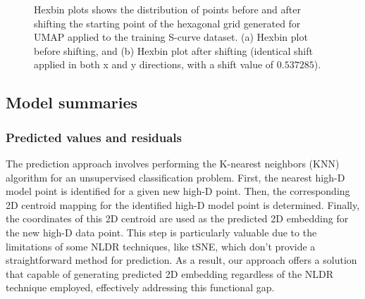 \documentclass[
  12pt]{article}
\begin{document}
\begin{figure}[H]


\caption{\label{fig-scurveshifthexgrids}Hexbin plots shows the
distribution of points before and after shifting the starting point of
the hexagonal grid generated for UMAP applied to the training S-curve
dataset. (a) Hexbin plot before shifting, and (b) Hexbin plot after
shifting (identical shift applied in both x and y directions, with a
shift value of \(0.537285\)).}

\end{figure}%

\subsection{Model summaries}\label{sec-summary}

\subsubsection{Predicted values and
residuals}\label{predicted-values-and-residuals}

The prediction approach involves performing the K-nearest neighbors
(KNN) algorithm for an unsupervised classification problem. First, the
nearest high-D model point is identified for a given new high-D point.
Then, the corresponding 2D centroid mapping for the identified high-D
model point is determined. Finally, the coordinates of this 2D centroid
are used as the predicted 2D embedding for the new high-D data point.
This step is particularly valuable due to the limitations of some NLDR
techniques, like tSNE, which don't provide a straightforward method for
prediction. As a result, our approach offers a solution that capable of
generating predicted 2D embedding regardless of the NLDR technique
employed, effectively addressing this functional gap.
\end{document}
